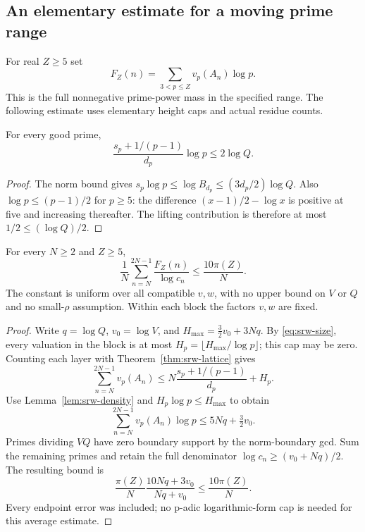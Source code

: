 \subsection{An elementary estimate for a moving prime range}
For real $Z\ge5$ set
\[
 F_Z(n)=\sum_{3<p\le Z}v_p(A_n)\log p.
\]
This is the full nonnegative prime-power mass in the specified range. The
following estimate uses elementary height caps and actual residue counts.

\begin{lemma}\label{lem:srw-density}
For every good prime,
\[
 \frac{s_p+1/(p-1)}{d_p}\log p\le2\log Q.
\]
\end{lemma}
\begin{proof}
The norm bound gives
$s_p\log p\le\log B_{d_p}\le(3d_p/2)\log Q$.
Also $\log p\le(p-1)/2$ for $p\ge5$: the difference
$(x-1)/2-\log x$ is positive at five and increasing thereafter.
The lifting contribution is therefore at most $1/2\le(\log Q)/2$.
\end{proof}

\begin{theorem}\label{thm:srw-moving}
For every $N\ge2$ and $Z\ge5$,
\begin{equation}\label{eq:srw-moving}
 \frac1N\sum_{n=N}^{2N-1}\frac{F_Z(n)}{\log c_n}
 \le\frac{10\pi(Z)}N.
\end{equation}
The constant is uniform over all compatible $v,w$, with no upper bound on
$V$ or $Q$ and no small-$\rho$ assumption. Within each block the factors
$v,w$ are fixed.
\end{theorem}
\begin{proof}
Write $q=\log Q$, $v_0=\log V$, and
$H_{\max}=\tfrac32v_0+3Nq$. By \eqref{eq:srw-size}, every valuation in
the block is at most $H_p=\lfloor H_{\max}/\log p\rfloor$; this cap may
be zero. Counting each layer with Theorem~\ref{thm:srw-lattice} gives
\[
 \sum_{n=N}^{2N-1}v_p(A_n)
 \le N\frac{s_p+1/(p-1)}{d_p}+H_p.
\]
Use Lemma~\ref{lem:srw-density} and $H_p\log p\le H_{\max}$ to obtain
\[
 \sum_{n=N}^{2N-1}v_p(A_n)\log p
 \le5Nq+\tfrac32v_0.
\]
Primes dividing $VQ$ have zero boundary support by the norm-boundary gcd.
Sum the remaining primes and retain the full denominator
$\log c_n\ge(v_0+Nq)/2$. The resulting bound is
\[
 \frac{\pi(Z)}N\frac{10Nq+3v_0}{Nq+v_0}
 \le\frac{10\pi(Z)}N.
\]
Every endpoint error was included; no p-adic logarithmic-form cap is needed
for this average estimate.
\end{proof}

